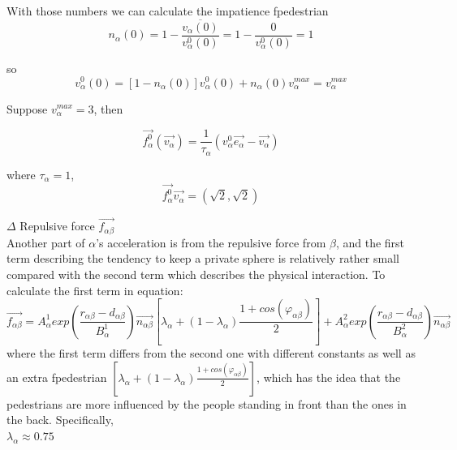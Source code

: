 With those numbers we can calculate the impatience fpedestrian 
 \begin{equation}
 n_{\alpha}(0)=1-\frac{\overline{v_{\alpha}(0)}}{v^{0}_{\alpha}(0)}=1-\dfrac{0}{v^{0}_{\alpha}(0)}=1
 \end{equation}

so 
 \begin{equation}
 v^{0}_{\alpha}(0)=[1-n_{\alpha}(0)]v^{0}_{\alpha}(0) + n_{\alpha}(0)v_{\alpha}^{max} = v_{\alpha}^{max}
 \end{equation}
 
Suppose $v_{\alpha}^{max}=3$, then 

 \begin{equation}
 	\vec{f^{0}_{\alpha}} \left( \vec{v_{\alpha}} \right) 
= 	\frac{1}{\tau_{\alpha}} \left( v^{0}_{\alpha} 
	\vec{e_{\alpha}} - \vec{v_{\alpha}} \right)
 \end{equation}
 
where $\tau_{\alpha}=1$,
 \begin{equation}
 \overrightarrow{f^{0}_{\alpha}}\overrightarrow{v_{\alpha}} = (\sqrt{2}, \sqrt{2})
 \end{equation}

$\Delta$ Repulsive force $ \overrightarrow{f_{\alpha\beta}} $\\

Another part of $\alpha$'s acceleration is from the repulsive force from $\beta$, and the first term describing the tendency to keep a private sphere is relatively rather small compared with the second term which describes the physical interaction.
To calculate the first term in equation:
 \begin{equation}
\overrightarrow{f_{\alpha\beta}}=A^{1}_{\alpha} exp(\frac{r_{\alpha\beta}-d_{\alpha\beta}}{B^{1}_{\alpha}})\overrightarrow{n_{\alpha \beta}}\left[ \lambda_{\alpha} +(1-\lambda_{\alpha})\frac{1+cos(\varphi_{\alpha\beta})}{2}\right]+ A^{2}_{\alpha}exp(\frac{r_{\alpha\beta}-d_{\alpha\beta}}{B^{2}_{\alpha}})\overrightarrow{n_{\alpha\beta}}
 \end{equation}
where the first term differs from the second one with different constants as well as an extra fpedestrian $ \left[ \lambda_{\alpha} +(1-\lambda_{\alpha})\frac{1+cos(\varphi_{\alpha\beta})}{2}\right] $, which has the idea that the pedestrians are more influenced by the people standing in front than the ones in the back. Specifically, \\

$\lambda_{\alpha} \approx 0.75$


